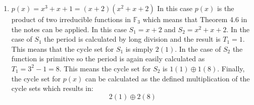 \documentclass{article}
\begin{document}
\begin{enumerate}
    \item $p(x)=x^3+x+1=(x+2)(x^2+x+2)$ \newline
    In this case $p(x)$ is the product of two irreducible functions in $\mathbb F_{3}$ which means that Theorem 4.6 in the notes can be applied. In this case $S_1 = x+2$ and $S_2 = x^2+x+2$. In the case of $S_1$ the period is calculated by long division and the result is $T_1 = 1$. This means that the cycle set for $S_1$ is simply $2(1)$. In the case of $S_2$ the function is primitive so the period is again easily calculated as $T_1 = 3^2-1 = 8$. This means the cycle set for $S_2$ is $1(1) \oplus 1(8)$. 
    Finally, the cycle set for $p(x)$ can be calculated as the defined multiplication of the cycle sets which results in:
    $$2(1) \oplus 2(8)$$
\end{enumerate}
\end{document}
